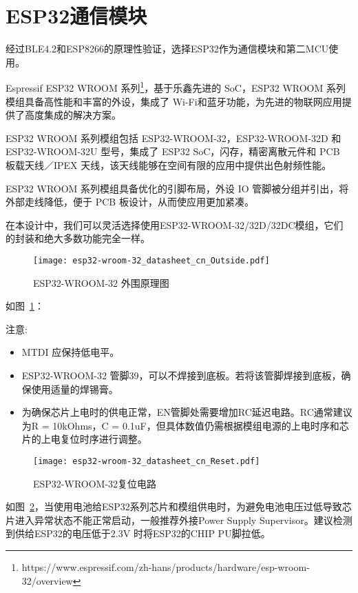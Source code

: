 \section{ESP32通信模块}

经过BLE4.2和ESP8266的原理性验证，选择ESP32作为通信模块和第二MCU使用。

Espressif ESP32 WROOM 系列\footnote{https://www.espressif.com/zh-hans/products/hardware/esp-wroom-32/overview}，基于乐鑫先进的 SoC，ESP32 WROOM 系列模组具备高性能和丰富的外设，集成了 Wi-Fi和蓝牙功能，为先进的物联网应用提供了高度集成的解决方案。

ESP32 WROOM 系列模组包括 ESP32-WROOM-32，ESP32-WROOM-32D 和 ESP32-WROOM-32U 型号，集成了 ESP32 SoC，闪存，精密离散元件和 PCB 板载天线／IPEX 天线，该天线能够在空间有限的应用中提供出色射频性能。

ESP32 WROOM 系列模组具备优化的引脚布局，外设 IO 管脚被分组并引出，将外部走线降低，便于 PCB 板设计，从而使应用更加紧凑。

在本设计中，我们可以灵活选择使用ESP32-WROOM-32/32D/32DC模组，它们的封装和绝大多数功能完全一样。

\begin{figure}[htbp]
    \centering
    \texttt{[image: esp32-wroom-32\_datasheet\_cn\_Outside.pdf]}
    \caption{ESP32-WROOM-32 外围原理图}
    \label{fig:ESP32Outside}
\end{figure}

如图~\ref{fig:ESP32Outside}：

注意:

\begin{itemize}
    \item MTDI 应保持低电平。
    \item ESP32-WROOM-32 管脚39，可以不焊接到底板。若将该管脚焊接到底板，确保使用适量的焊锡膏。
    \item 为确保芯片上电时的供电正常，EN管脚处需要增加RC延迟电路。RC通常建议为R = 10kOhms，C = 0.1uF，但具体数值仍需根据模组电源的上电时序和芯片的上电复位时序进行调整。
\end{itemize}

\begin{figure}[htbp]
    \centering
    \texttt{[image: esp32-wroom-32\_datasheet\_cn\_Reset.pdf]}
    \caption{ESP32-WROOM-32复位电路}
    \label{fig:ESP32Reset}
\end{figure}

如图~\ref{fig:ESP32Reset}，当使用电池给ESP32系列芯片和模组供电时，为避免电池电压过低导致芯片进入异常状态不能正常启动，一般推荐外接Power Supply Supervisor。建议检测到供给ESP32的电压低于2.3V 时将ESP32的CHIP PU脚拉低。

